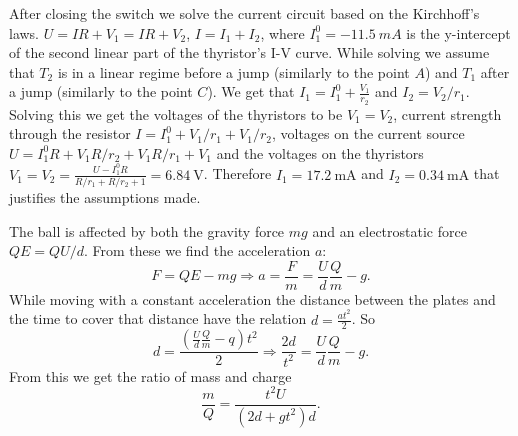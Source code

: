 \documentclass[11pt]{article}
\begin{document}
After closing the switch we solve the current circuit based on the Kirchhoff’s laws. $U = IR + V_1 = IR + V_2$, $I = I_1 + I_2$, where $I_1^0=\SI{-11.5}{mA}$ is the y-intercept of the second linear part of the thyristor’s I-V curve. While solving we assume that $T_2$ is in a linear regime before a jump (similarly to the point $A$) and $T_1$ after a jump (similarly to the point $C$). We get that $I_1 = I_1^0 + \frac{V_1}{r_2}$ and $I_2 = V_2/r_1$. Solving this we get the voltages of the thyristors to be $V_1 = V_2$, current strength through the resistor $I = I_1^0 + V_1/r_1 + V_1/r_2$, voltages on the current source $U = I_1^0R + V_1R/r_2 + V_1R/r_1 + V_1$ and the voltages on the thyristors $V_1 = V_2 = \frac{U - I_1^0R}{R/r_1 + R/r_2 + 1} = \SI{6.84}{\volt}$. Therefore $I_1 = \SI{17.2}{\milli\ampere}$ and $I_2 = \SI{0.34}{\milli\ampere}$ that justifies the assumptions made.
\probend
\bigskip


\solueng
The ball is affected by both the gravity force $mg$ and an electrostatic force $QE=QU/d$. From these we find the acceleration $a$:
\[ F = QE - mg \Rightarrow a = \frac{F}{m} = \frac{U}{d}\frac{Q}{m} - g. \]
While moving with a constant acceleration the distance between the plates and the time to cover that distance have the relation $ d = \frac{at^2}{2} $. So
\[ d = \frac{\left(\frac{U}{d}\frac{Q}{m} - q\right)t^2}{2} \Rightarrow \frac{2d}{t^2} = \frac{U}{d}\frac{Q}{m} - g. \] 
From this we get the ratio of mass and charge
\[ \frac{m}{Q} = \frac{t^2U}{\left(2d + gt^2\right)d}.  \]
\probend
\bigskip

\end{document}
